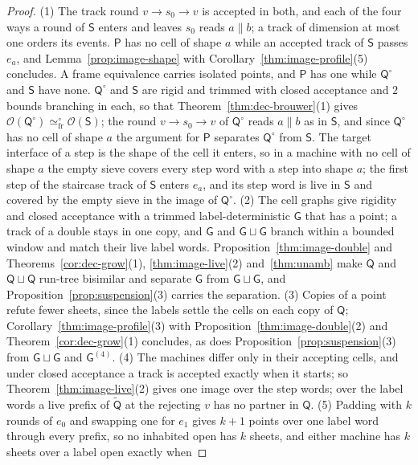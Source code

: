 \documentclass{lmcs}
\theoremstyle{definition}
\theoremstyle{remark}
\newcommand{\Op}{\mathcal{O}}
\newcommand{\eqFrF}{\simeq^{\circ}_{\mathrm{fr}}}
\providecommand{\dsum}{\sqcup}
\providecommand{\wQ}{\mathsf{Q}}
\providecommand{\dsum}{\sqcup}
\providecommand{\wG}{\mathsf{G}}
\providecommand{\wQ}{\mathsf{Q}}
\providecommand{\wQt}{\tilde{\mathsf{Q}}}
\begin{document}
\begin{proof}
(1) The track round $v\to s_0\to v$ is accepted in both, and each of the four ways a round of $\mathsf S$
enters and leaves $s_0$ reads $a\parallel b$;
a track of dimension at most one orders its events.
$\mathsf P$ has no cell of shape $a$ while an accepted track of $\mathsf S$ passes $e_a$, and
Lemma~\ref{prop:image-shape} with Corollary~\ref{thm:image-profile}(5)
concludes.
A frame equivalence carries isolated points, and $\mathsf P$ has one while $\wQ^\circ$ and $\mathsf S$ have none.
$\wQ^\circ$ and $\mathsf S$ are rigid and trimmed with closed acceptance and $2$ bounds branching in each, so that
Theorem~\ref{thm:dec-brouwer}(1) gives $\Op(\wQ^\circ)\eqFrF\Op(\mathsf S)$; the
round $v\to s_0\to v$ of $\wQ^\circ$ reads $a\parallel b$ as in $\mathsf S$, and since $\wQ^\circ$ has no cell of
shape $a$ the argument for $\mathsf P$ separates $\wQ^\circ$ from $\mathsf S$.
The target interface of a step is the shape of the cell it enters, so in a machine
with no cell of shape $a$ the empty sieve covers every step word with a step into shape $a$;
the first step of the staircase track of $\mathsf S$ enters $e_a$, and its step word is live in $\mathsf S$ and covered
by the empty sieve in the image of $\wQ^\circ$.
(2) The cell graphs give rigidity and closed acceptance with a trimmed label-deterministic $\wG$ that has a
point; a track of a double stays in one copy, and $\wG$ and $\wG\dsum\wG$ branch within a bounded window and match their
live label words.
Proposition~\ref{thm:image-double} and Theorems~\ref{cor:dec-grow}(1), \ref{thm:image-live}(2) and~\ref{thm:unamb}
make $\wQ$ and $\wQ\dsum \wQ$ run-tree bisimilar and separate $\wG$ from $\wG\dsum\wG$, and Proposition~\ref{prop:suspension}(3)
carries the separation.
(3) Copies of a point refute fewer sheets, since the labels settle the cells on each copy of
$\wQ$;
Corollary~\ref{thm:image-profile}(3) with Proposition~\ref{thm:image-double}(2) and Theorem~\ref{cor:dec-grow}(1)
concludes, as does
Proposition~\ref{prop:suspension}(3) from $\wG\dsum\wG$ and $\wG^{(4)}$.
(4) The machines differ only in their accepting cells, and under closed acceptance a track is accepted exactly when it
starts; so
Theorem~\ref{thm:image-live}(2) gives one image over the step
words;
over the label words a live prefix of $\wQt$ at the rejecting $v$ has no partner in
$\wQ$.
(5) Padding with $k$ rounds of $e_0$ and swapping one for $e_1$ gives $k+1$ points over one label word through
every prefix, so no inhabited open has $k$ sheets, and either machine has $k$ sheets over a label open exactly when

\end{proof}
\end{document}
